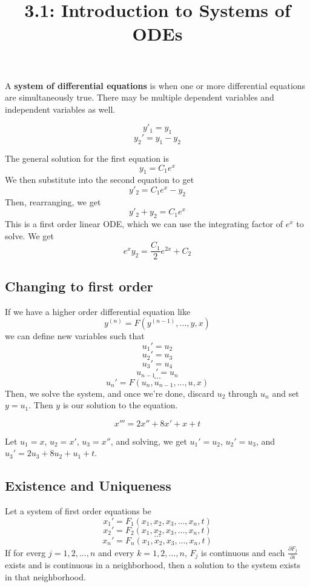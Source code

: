 \documentclass{article}
\title{3.1: Introduction to Systems of ODEs}
\begin{document}
\maketitle
\begin{definition}
A \textbf{system of differential equations} is when one or more differential equations are simultaneously true. There may be multiple dependent variables and independent variables as well. 
\end{definition}
\begin{example}
$$y'_1 = y_1$$$$y_2'= y_1 - y_2$$
\end{example}

\begin{solution}
The general solution for the first equation is $$y_1 = C_1e^x$$We then substitute into the second equation to get $$y'_2 = C_1e^x - y_2$$Then, rearranging, we get $$y'_2 + y_2 = C_1e^x$$This is a first order linear ODE, which we can use the integrating factor of $e^x$ to solve. We get $$e^x y_2 = \frac{C_1}{2}e^{2x} + C_2$$
\end{solution}

\subsection{Changing to first order}
If we have a higher order differential equation like $$y^{(n)} = F(y^{(n-1)}, ... , y,x)$$we can define new variables such that $$u_1' = u_2$$ $$u_2' = u_3$$$$u_3' = u_4$$ $$u_{n-1}' = u_n$$ $$...$$ $$u_n' = F(u_n,u_{n-1},...,u,x)$$Then, we solve the system, and once we're done, discard $u_2$ through $u_n$ and set $y = u_1$. Then $y$ is our solution to the equation.

\begin{example}
$$x''' = 2x'' + 8x' + x + t$$
\end{example}

\begin{solution}
Let $u_1 = x$, $u_2 = x'$, $u_3 = x''$, and solving, we get $u_1' = u_2$, $u_2' = u_3$, and $u_3' = 2u_3 + 8u_2 + u_1 + t$.
\end{solution}


\subsection{Existence and Uniqueness}
\begin{theorem}
Let a system of first order equations be $$x_1' = F_1(x_1, x_2,x_3,...,x_n,t)$$ $$ x_2' = F_2(x_1,x_2,x_3,...,x_n,t)$$$$...$$$$x_n' = F_n(x_1,x_2,x_3,...,x_n,t)$$
If for everg $j = 1,2,...,n$ and every $k = 1,2,...,n$, $F_j$ is continuous and each $\frac{\partial F_j}{\partial i}$ exists and is continuous in a neighborhood, then a solution to the system exists in that neighborhood.
\end{theorem}
\end{document}
